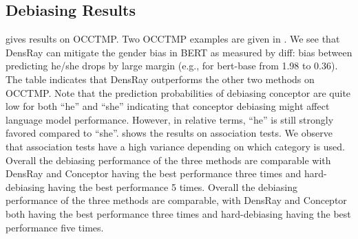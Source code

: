 
\subsection{Debiasing Results}
 gives results on OCCTMP. Two OCCTMP
examples are given in . We see that
DensRay can mitigate the gender bias in BERT as measured by
diff: bias between predicting he/she drops by large margin
(e.g., for bert-base from 1.98 to 0.36). The table indicates
that DensRay outperforms the other two methods on OCCTMP.
Note that
the prediction probabilities of debiasing conceptor are
quite low for both ``he'' and ``she'' indicating that conceptor debiasing might affect language model performance. However,
in relative terms, ``he'' is still strongly favored compared
to ``she''.
 shows the results on association tests. We observe that association tests have a high variance depending on which category is used. 
Overall the debiasing performance of the three methods are comparable with DensRay and Conceptor having the best performance three times and hard-debiasing having the best performance 5 times.
Overall the debiasing performance of the three methods are comparable, with DensRay and Conceptor both having the best performance three times and hard-debiasing having the best performance five times.

